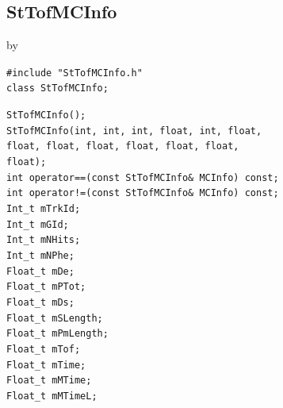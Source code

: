 \documentclass[twoside]{article}
\newcommand{\entrylabel}[1]{\mbox{\textbf{{#1}}}\hfil}%
\newenvironment{entry}
{\begin{list}{}%
    {\renewcommand{\makelabel}{\entrylabel}%
     \setlength{\labelwidth}{90pt}%
     \setlength{\leftmargin}{\labelwidth}
     \advance\leftmargin by \labelsep%
      }%
    }%
  {\end{list}}
\newcommand{\Entrylabel}[1]%
{\raisebox{0pt}[1ex][0pt]{\makebox[\labelwidth][l]%
    {\parbox[t]{\labelwidth}{\hspace{0pt}\textbf{{#1}}}}}}
\newenvironment{Entry}%
{\renewcommand{\entrylabel}{\Entrylabel}\begin{entry}}%
  {\end{entry}}
\begin{document}
\subsection{StTofMCInfo}
\label{sec:StTofMCInfo}
\begin{Entry}
\item[Summary]
\item[Synopsis]
    \verb+#include "StTofMCInfo.h"+\\
    \verb+class StTofMCInfo;+\\
\item[Description]
\item[Related Classes]
\item[Public\\ Constructors]
    \verb+StTofMCInfo();+\\
    \verb+StTofMCInfo(int, int, int, float, int, float, +\\
    \verb+float, float, float, float, float, float, +\\
    \verb+float);+\\
    \verb+int operator==(const StTofMCInfo& MCInfo) const;+\\
    \verb+int operator!=(const StTofMCInfo& MCInfo) const;+\\
    \verb+Int_t mTrkId;+\\
    \verb+Int_t mGId;+\\
    \verb+Int_t mNHits;+\\
    \verb+Int_t mNPhe; +\\
    \verb+Float_t mDe;+\\
    \verb+Float_t mPTot;+\\
    \verb+Float_t mDs;+\\
    \verb+Float_t mSLength;+\\
    \verb+Float_t mPmLength;+\\
    \verb+Float_t mTof;+\\
    \verb+Float_t mTime;+\\
    \verb+Float_t mMTime;+\\
    \verb+Float_t mMTimeL;+\\
\end{Entry}
\clearpage
\end{document}
